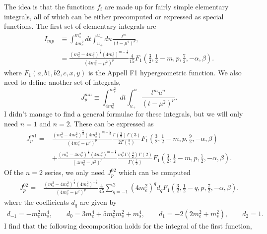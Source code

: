 \documentclass[11pt, a4paper]{article}
\begin{document}
The idea is that the functions $f_i$ are made up for fairly simple
elementary integrals, all of which can be either precomputed or expressed as
special functions. The first set of elementary integrals are
%
\begin{align*}  I_{mp} &\equiv \int^{m_s^2}_{4m_e^2} dt \int_{u_+}^{u_-} du \frac{t^m}{(t-\mu^2)^p},\\ &= \frac{\left(m_s^2-4m_e^2\right)^\frac{5}{2}\left(4m_e^2\right)^{m-\frac{1}{2}}}{\left(4m_e^2-\mu^2\right)^p}\frac{4}{15}F_1\left(\frac{3}{2},\frac{1}{2}-m,p,\frac{7}{2},-\alpha,\beta\right). \end{align*}
%
where $F_1(a,b1,b2,c,x,y)$ is the Appell F1 hypergeometric function. We also need to define another set of integrals, 
%
\[   J^{mn}_{p} \equiv \int_{4m_e^2}^{m_s^2}dt \int_{u_+}^{u_-} \frac{t^m u^n}{(t-\mu^2)^p}. \]
%
I didn't manage to find a general formulae for these integrals, but we will only need $n=1$ and $n=2$. These can be expressed as
%
\begin{align*}
%
J^{m1}_p = &\frac{\left(m_s^2-4m_e^2\right)^\frac{7}{2}\left(4m_e^2\right)^{m-\frac{1}{2}}}{\left(4m_e^2-\mu^2\right)^p}\frac{\Gamma\left(\frac{3}{2}\right)\Gamma\left(3\right)}{2\Gamma\left(\frac{9}{2}\right)}F_1\left(\frac{3}{2},\frac{1}{2}-m,p,\frac{9}{2},-\alpha,\beta\right)\\ 
%
&+ \frac{\left(m_s^2-4m_e^2\right)^\frac{5}{2}\left(4m_e^2\right)^{m-\frac{1}{2}}}{\left(4m_e^2-\mu^2\right)^p}\frac{m_e^2\Gamma\left(\frac{3}{2}\right)\Gamma\left(2\right)}{\Gamma\left(\frac{7}{2}\right)}F_1\left(\frac{3}{2},\frac{1}{2}-m,p,\frac{7}{2},-\alpha,\beta\right).
%
\end{align*}
%
Of the $n=2$ series, we only need $J^{02}_p$ which can be computed 
%
\begin{align*}
J^{02}_p = &\frac{\left(m_s^2-4m_e^2\right)^\frac{5}{2}\left(4m_e^2\right)^{-\frac{1}{2}}}{\left(4m_e^2-\mu^2\right)^p} \frac{4}{45}\sum_{q=-1}^2\left(4m_e^2\right)^q d_q F_1\left(\frac{3}{2},\frac{1}{2}-q,p,\frac{7}{2},-\alpha,\beta\right). 
\end{align*}
%
where the coefficients $d_q$ are given by 
%
\begin{align*}
d_{-1} = -m_e^2m_s^4,\qquad d_{0} = 3m_e^4 + 5m_e^2m_s^2 + m_s^4,\qquad d_{1} = -2(2m_e^2 +m_s^2),\qquad d_{2} = 1.
\end{align*}
%
I find that the following decomposition holds for the integral of the first function,
%
\end{document}
